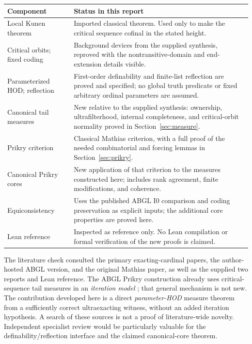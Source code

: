 \documentclass[11pt,letterpaper]{article}
\theoremstyle{definition}
\newcommand{\Izero}{\mathrm I0}
\begin{document}
\begin{center}
\small
\renewcommand{\arraystretch}{1.16}
\begin{tabularx}{\textwidth}{@{}p{}X@{}}
\toprule
\textbf{Component}&\textbf{Status in this report}\\
\midrule
Local Kunen theorem&Imported classical theorem. Used only to make the critical sequence cofinal in the stated height.\\
Critical orbits; fixed coding&Background devices from the supplied synthesis, reproved with the nontransitive-domain and end-extension details visible.\\
Parameterized HOD; reflection&First-order definability and finite-list reflection are proved and specified; no global truth predicate or fixed arbitrary ordinal parameters are assumed.\\
Canonical tail measures&New relative to the supplied synthesis: ownership, ultrafilterhood, internal completeness, and critical-orbit normality proved in Section~\ref{sec:measure}.\\
Prikry criterion&Classical Mathias criterion, with a full proof of the needed combinatorial and forcing lemmas in Section~\ref{sec:prikry}.\\
Canonical Prikry cores&New application of that criterion to the measures constructed here; includes rank agreement, finite modifications, and coherence.\\
Equiconsistency&Uses the published ABGL $\Izero$ comparison and coding preservation as explicit inputs; the additional core properties are proved here.\\
Lean reference&Inspected as reference only. No Lean compilation or formal verification of the new proofs is claimed.\\
\bottomrule
\end{tabularx}
\end{center}

The literature check consulted the primary exacting-cardinal papers, the author-hosted ABGL version, and the original Mathias paper, as well as the supplied two reports and Lean reference. The ABGL Prikry construction already uses critical-sequence tail measures in an \emph{iteration model} \cite[Section~5.2]{abgl}; that general mechanism is not new. The contribution developed here is a direct \emph{parameter-HOD} measure theorem from a sufficiently correct ultraexacting witness, without an added iteration hypothesis. A search of these sources is not a proof of literature-wide novelty. Independent specialist review would be particularly valuable for the definability/reflection interface and the claimed canonical-core theorem.
\end{document}
